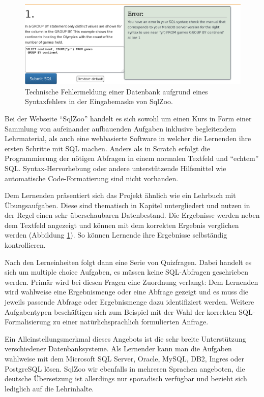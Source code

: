 \begin{figure}[p]
  \centering \includegraphics[width=\textwidth]{images/related-work-sql-zoo-error.png}
  \caption{Technische Fehlermeldung einer Datenbank aufgrund eines Syntaxfehlers in der Eingabemaske von SqlZoo.}
  \label{fig:sqlzoo-check-result}
\end{figure}

Bei der Webseite "`SqlZoo"' handelt es sich sowohl um einen Kurs in Form einer Sammlung von aufeinander aufbauenden Aufgaben inklusive begleitendem Lehrmaterial, als auch eine webbasierte Software in welcher die Lernenden ihre ersten Schritte mit SQL machen. Anders als in Scratch erfolgt die Programmierung der nötigen Abfragen in einem normalen Textfeld und "`echtem"' SQL. Syntax-Hervorhebung oder andere unterstützende Hilfsmittel wie automatische Code-Formatierung sind nicht vorhanden.

Dem Lernenden präsentiert sich das Projekt ähnlich wie ein Lehrbuch mit Übungsaufgaben. Diese sind thematisch in Kapitel untergliedert und nutzen in der Regel einen sehr überschaubaren Datenbestand. Die Ergebnisse werden neben dem Textfeld angezeigt und können mit dem korrekten Ergebnis verglichen werden (Abbildung \ref{fig:sqlzoo-check-result}). So können Lernende ihre Ergebnisse selbständig kontrollieren.

Nach den Lerneinheiten folgt dann eine Serie von Quizfragen. Dabei handelt es sich um multiple choice Aufgaben, es müssen keine SQL-Abfragen geschrieben werden. Primär wird bei diesen Fragen eine Zuordnung verlangt: Dem Lernenden wird wahlweise eine Ergebnismenge oder eine Abfrage gezeigt und es muss die jeweils passende Abfrage oder Ergebnismenge dazu identifiziert werden. Weitere Aufgabentypen beschäftigen sich zum Beispiel mit der Wahl der korrekten SQL-Formalisierung zu einer natürlichsprachlich formulierten Anfrage.

Ein Alleinstellungsmerkmal dieses Angebots ist die sehr breite Unterstützung verschiedener Datenbanksysteme. Als Lernender kann man die Aufgaben wahlweise mit dem Microsoft SQL Server, Oracle, MySQL, DB2, Ingres oder PostgreSQL lösen. SqlZoo wir ebenfalls in mehreren Sprachen angeboten, die deutsche Übersetzung ist allerdings nur sporadisch verfügbar und bezieht sich lediglich auf die Lehrinhalte.

